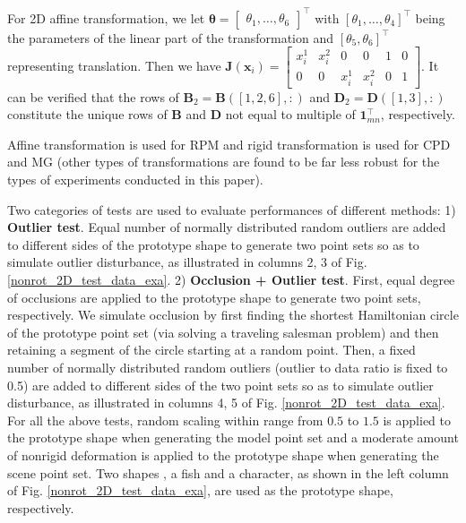 \documentclass[11pt,bezier,]{article}
\begin{document}
For 2D affine transformation,
we let
${\boldsymbol\theta}=\begin{bmatrix} \theta_1, \ldots, \theta_6 \end{bmatrix}^\top$
with $[\theta_1,\ldots, \theta_4 ]^\top$ 
being the parameters of the linear part of the transformation and
$[\theta_5, \theta_6]^\top$ representing  translation.
Then we  have
$\mathbf J(\mathbf x_i)=\begin{bmatrix}
x_i^1& x_i^2&0&0&1&0\\
0&0&x_i^1& x_i^2&0&1
\end{bmatrix}$.
It can be verified that the rows of 
$\mathbf B_2=\mathbf B([1,2,6],:)$ and $\mathbf D_2=\mathbf D([1,3],:)$ 
constitute the unique rows of $\mathbf B$ and $\mathbf D$ 
not equal to multiple of $\mathbf 1_{mn}^\top$, respectively.









Affine transformation is used for RPM and
rigid transformation is used for CPD and MG 
(other types of transformations are found to be far less robust 
for the types of experiments conducted in this paper). 



Two categories of tests are used to evaluate  performances of different methods:
1) \textbf{Outlier test}.
Equal number of normally distributed random outliers are added to 
different sides of the prototype shape to generate  two point sets
so as to simulate outlier disturbance, %
as illustrated in columns 2, 3 of Fig. \ref{nonrot_2D_test_data_exa}.
2) \textbf{Occlusion + Outlier test}.
First, 
equal degree of occlusions are applied to the prototype shape 
to generate  two point sets, respectively.
We simulate occlusion by first finding the shortest Hamiltonian circle of the prototype point set 
(via solving a traveling salesman problem) 
and then retaining a segment of the circle starting at a random point.
Then,
a fixed number of normally distributed random outliers (outlier to data ratio is fixed to 0.5) 
are added to different sides of the two point sets
so as to simulate outlier disturbance,
as illustrated in columns 4, 5 of Fig. \ref{nonrot_2D_test_data_exa}.
For all the above tests,
 random scaling within range  from $0.5$ to $1.5$ is applied to the prototype shape 
when generating the model point set and
a moderate amount of nonrigid deformation is applied to the prototype shape 
when generating the scene point set.
Two shapes \cite{RPM_TPS}, a fish and a character,
as shown in the left column of Fig. \ref{nonrot_2D_test_data_exa},
are used as the prototype shape, respectively.
\end{document}

